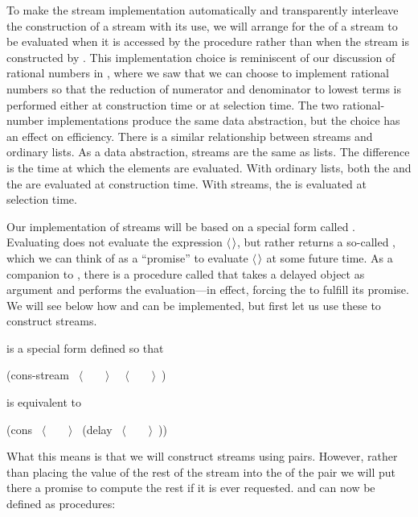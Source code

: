 \noindent
To make the stream implementation automatically and transparently interleave
the construction of a stream with its use, we will arrange for the 
of a stream to be evaluated when it is accessed by the 
procedure rather than when the stream is constructed by .
This implementation choice is reminiscent of our discussion of rational numbers
in , where we saw that we can choose to implement rational
numbers so that the reduction of numerator and denominator to lowest terms is
performed either at construction time or at selection time.  The two
rational-number implementations produce the same data abstraction, but the
choice has an effect on efficiency.  There is a similar relationship between
streams and ordinary lists.  As a data abstraction, streams are the same as
lists.  The difference is the time at which the elements are evaluated.  With
ordinary lists, both the  and the  are evaluated at
construction time.  With streams, the  is evaluated at selection
time.

Our implementation of streams will be based on a special form called
.  Evaluating  does not evaluate the
expression \( \langle \)\( \kern0.08em\rangle \), but rather returns a so-called , which we can think of as a ``promise'' to evaluate \( \langle \)\( \kern0.08em\rangle \) at some
future time.  As a companion to , there is a procedure called
 that takes a delayed object as argument and performs the
evaluation---in effect, forcing the  to fulfill its promise.  We
will see below how  and  can be implemented, but first
let us use these to construct streams.

 is a special form defined so that

\begin{codeBlock}
(cons-stream ~\(\langle \)~~~~\(\rangle \)~ ~\(\langle \)~~~~\(\rangle \)~)
\end{codeBlock}

\noindent
is equivalent to

\begin{codeBlock}
(cons ~\(\langle \)~~~~\(\rangle \)~ (delay ~\(\langle \)~~~~\(\rangle \)~))
\end{codeBlock}

\noindent
What this means is that we will construct streams using pairs.  However, rather
than placing the value of the rest of the stream into the  of the
pair we will put there a promise to compute the rest if it is ever requested.
 and  can now be defined as procedures:

